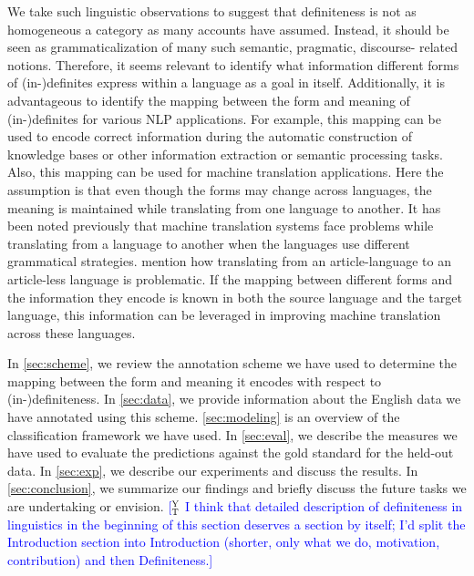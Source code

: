 \documentclass[11pt,letterpaper]{article}
\newcommand{\ensuretext}[1]{#1}
\newcommand{\nssmarker}{\ensuretext{\textcolor{magenta}{\ensuremath{^{\textsc{NS}}_{\textsc{S}}}}}}
\newcommand{\abmarker}{\ensuretext{\textcolor{red}{\ensuremath{^{\textsc{A}}_{\textsc{B}}}}}}
\newcommand{\ytmarker}{\ensuretext{\textcolor{blue}{\ensuremath{^{\textsc{Y}}_{\textsc{T}}}}}}
\newcommand{\arkcomment}[3]{\ensuretext{\textcolor{#3}{[#1 #2]}}}
\newcommand{\nss}[1]{\arkcomment{\nssmarker}{#1}{magenta}}
\newcommand{\ab}[1]{\arkcomment{\abmarker}{#1}{red}}
\newcommand{\yt}[1]{\arkcomment{\ytmarker}{#1}{blue}}
\begin{document}
We take such linguistic observations to suggest that definiteness is not as homogeneous a category as many accounts have assumed. Instead, it should be seen as grammaticalization of many such semantic, pragmatic, discourse- related notions. Therefore, it seems relevant to identify what information different forms of (in-)definites express within a language as a goal in itself. Additionally, it is advantageous to identify the mapping between the form and meaning of (in-)definites for various NLP applications. For example, this mapping can be used to encode correct information during the automatic construction of knowledge bases or other information extraction or semantic processing tasks. Also, this mapping can be used for machine translation applications. Here the assumption is that even though the forms may change across languages, the meaning is maintained while translating from one language to another. It has been noted previously that machine translation systems face problems while translating from a language to another when the languages use different grammatical strategies. \citet{tsvetkov13,stymne09} mention how translating from an article-language to an article-less language is problematic. If the mapping between different forms and the information they encode is known in both the source language and the target language, this information can be leveraged in improving machine translation across these languages.  

In \cref{sec:scheme}, we review the annotation scheme we have used to determine the mapping between the form and meaning it encodes with respect to (in-)definiteness. In \cref{sec:data}, we provide information about the English data we have annotated using this scheme. \cref{sec:modeling} is an overview of the classification framework we have used. In \cref{sec:eval}, we describe the measures we have used to evaluate the predictions against the gold standard for the held-out data. In \cref{sec:exp}, we describe our experiments and discuss the results. In \cref{sec:conclusion}, we summarize our findings and briefly discuss the future tasks we are undertaking or envision.    \yt{I think that detailed description of definiteness in linguistics in the beginning of this section deserves a section by itself; I'd split the Introduction section into Introduction (shorter, only what we do, motivation, contribution) and then Definiteness.} 

\end{document}
